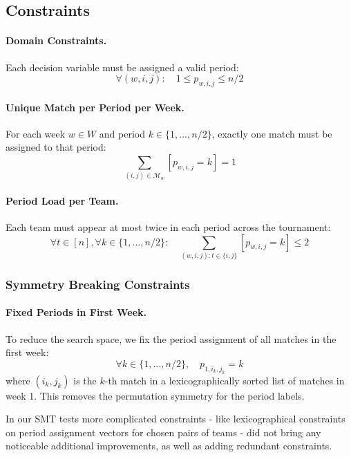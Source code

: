 \subsection{Constraints}

\paragraph{Domain Constraints.}
Each decision variable must be assigned a valid period:
\[
\forall (w,i,j): \quad 1 \leq p_{w,i,j} \leq n/2
\]

\paragraph{Unique Match per Period per Week.}
For each week $w \in W$ and period $k \in \{1, \dots, n/2\}$, exactly one match must be assigned to that period:
\[
\sum_{(i,j) \in \mathcal{M}_w} [p_{w,i,j} = k] = 1
\]

\paragraph{Period Load per Team.}
Each team must appear at most twice in each period across the tournament:
\[
\forall t \in [n], \forall k \in \{1, \dots, n/2\}: \quad \sum_{(w,i,j) : t \in \{i,j\}} [p_{w,i,j} = k] \leq 2
\]

\subsubsection*{Symmetry Breaking Constraints}

\paragraph{Fixed Periods in First Week.}
To reduce the search space, we fix the period assignment of all matches in the first week:
\[
\forall k \in \{1, \dots, n/2\},\quad p_{1,i_k,j_k} = k
\]
where $(i_k, j_k)$ is the $k$-th match in a lexicographically sorted list of matches in week 1. This removes the permutation symmetry for the period labels.

In our SMT tests more complicated constraints - like lexicographical constraints on period assignment vectors for chosen pairs of teams - did not bring any noticeable additional improvements, as well as adding redundant constraints. 


